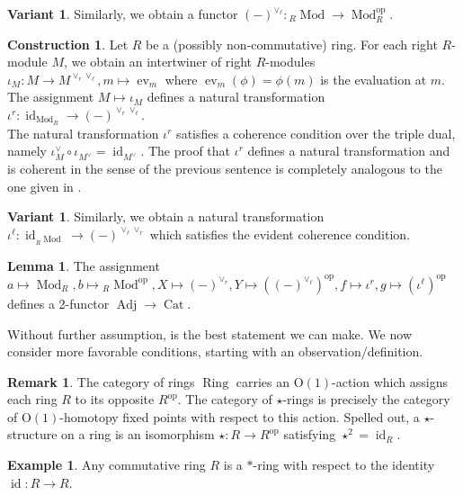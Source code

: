\documentclass{article}
\newcommand{\opp}{\operatorname{op}}%
\newcommand{\id}{\operatorname{id}}%
\newcommand{\ev}{\operatorname{ev}}%
\newcommand{\Cat}{\operatorname{Cat}}%
\newcommand{\Adj}{\operatorname{Adj}}%
\newcommand{\Mod}{\operatorname{Mod}}%
\newcommand{\Ring}{\operatorname{Ring}}%
\newcommand{\Oone}{\operatorname{O(1)}}
\numberwithin{equation}{section}
\theoremstyle{definition}
\newtheorem{construction}[definition]{Construction}
\newtheorem{example}[definition]{Example}
\newtheorem{lemma}[definition]{Lemma}
\newtheorem{remark}[definition]{Remark}
\newtheorem{variant}[definition]{Variant}
\theoremstyle{theorem}
\begin{document}
\begin{variant}
    Similarly, we obtain a functor $(-)^{\vee_\ell} \colon {}_{R}\!\Mod \to \Mod_R^{\opp}$. 
\end{variant}
\begin{construction}
    Let $R$ be a (possibly non-commutative) ring. For each right $R$-module $M$, we obtain an intertwiner of right $R$-modules $\iota_M \colon M \to M^{\vee_r \vee_\ell}, 
    m \mapsto \ev_m$ where $\ev_m(\phi) = \phi(m)$ is the evaluation at $m$. The assignment $M \mapsto \iota_M$ defines a natural transformation 
    $\iota^r \colon \id_{\Mod_R} \to (-)^{\vee_r \vee_\ell}$. \\
    The natural transformation $\iota^r$ satisfies a coherence condition over the triple dual, namely $\iota_M^{\vee} \circ \iota_{M^\vee} = \id_{M^\vee}$. 
    The proof that $\iota^r$ defines a natural transformation and is coherent in the sense of the previous sentence is completely analogous to the one 
    given in .
\end{construction}
\begin{variant}
    Similarly, we obtain a natural transformation $\iota^{\ell} \colon \id_{{}_{R}\!\Mod} \to (-)^{\vee_\ell \vee_r}$ which satisfies the evident coherence condition.
\end{variant}
\begin{lemma}\label{Lemma: The adjunction involving modules over non-commutative rings}
    The assignment $a \mapsto \Mod_R, b \mapsto {}_{R}\!\Mod^{\opp}, X \mapsto (-)^{\vee_r}, Y \mapsto ((-)^{\vee_\ell})^{\opp}, f \mapsto \iota^r, g \mapsto (\iota^{\ell})^{\opp}$
    defines a 2-functor $\Adj \to \Cat$. 
\end{lemma}
Without further assumption,  is the best statement we can make. 
We now consider more favorable conditions, starting with an observation/definition. 
\begin{remark}
    The category of rings $\Ring$ carries an $\Oone$-action which assigns each ring $R$ to its opposite $R^{\opp}$. The category of $\star$-rings 
    is precisely the category of $\Oone$-homotopy fixed points with respect to this action. Spelled out, a $\star$-structure on a ring is an isomorphism 
    $\star \colon R \to R^{\opp}$ satisfying $\star^2=\id_R$. 
\end{remark}
\begin{example}
    Any commutative ring $R$ is a $*$-ring with respect to the identity $\id \colon R \to R$. 
\end{example}
\end{document}
